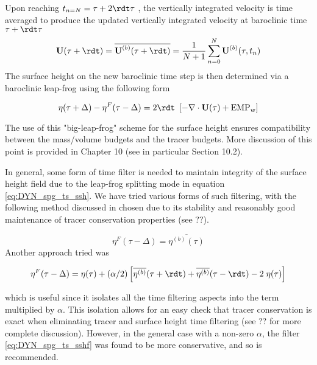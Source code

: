 \documentclass[../main/NEMO_manual]{subfiles}
\begin{document}
{Upon reaching $t_{n=N} = \tau + 2\rdt \tau$ ,
the vertically integrated velocity is time averaged to produce the updated vertically integrated velocity at
baroclinic time $\tau + \rdt \tau$
\[
  \textbf{U}(\tau+\rdt) = \overline{\textbf{U}^{(b)}(\tau+\rdt)} = \frac{1}{N+1} \sum\limits_{n=0}^N\textbf{U}^{(b)}(\tau,t_{n})
\]
The surface height on the new baroclinic time step is then determined via a baroclinic leap-frog using
the following form

\begin{equation}
  \label{eq:DYN_spg_ts_ssh}
  \eta(\tau+\Delta) - \eta^{F}(\tau-\Delta) = 2\rdt \ \left[ - \nabla \cdot \textbf{U}(\tau) + \text{EMP}_w \right]
\end{equation}

The use of this "big-leap-frog" scheme for the surface height ensures compatibility between
the mass/volume budgets and the tracer budgets.
More discussion of this point is provided in Chapter 10 (see in particular Section 10.2).

In general, some form of time filter is needed to maintain integrity of the surface height field due to
the leap-frog splitting mode in equation \autoref{eq:DYN_spg_ts_ssh}.
We have tried various forms of such filtering,
with the following method discussed in \cite{griffies.pacanowski.ea_MWR01} chosen due to
its stability and reasonably good maintenance of tracer conservation properties (see ??).

\begin{equation}
  \label{eq:DYN_spg_ts_sshf}
  \eta^{F}(\tau-\Delta) =  \overline{\eta^{(b)}(\tau)}
\end{equation}
Another approach tried was

\[
  \eta^{F}(\tau-\Delta) = \eta(\tau)
  + (\alpha/2) \left[\overline{\eta^{(b)}}(\tau+\rdt)
    + \overline{\eta^{(b)}}(\tau-\rdt) -2 \;\eta(\tau) \right]
\]

which is useful since it isolates all the time filtering aspects into the term multiplied by $\alpha$.
This isolation allows for an easy check that tracer conservation is exact when
eliminating tracer and surface height time filtering (see ?? for more complete discussion).
However, in the general case with a non-zero $\alpha$,
the filter \autoref{eq:DYN_spg_ts_sshf} was found to be more conservative, and so is recommended.

}            %

\end{document}
